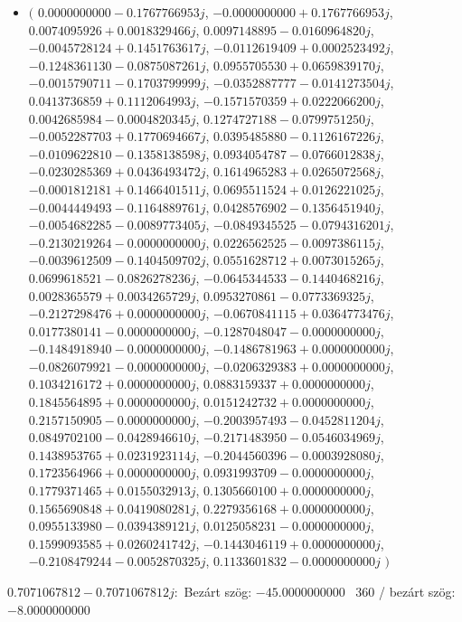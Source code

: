 \documentclass[14pt,a4paper]{article}
\begin{document}
\begin{itemize}
\item
$\big($
$0.0000000000-0.1767766953j$, $-0.0000000000+0.1767766953j$, $0.0074095926+0.0018329466j$, $0.0097148895-0.0160964820j$, $-0.0045728124+0.1451763617j$, $-0.0112619409+0.0002523492j$, $-0.1248361130-0.0875087261j$, $0.0955705530+0.0659839170j$, $-0.0015790711-0.1703799999j$, $-0.0352887777-0.0141273504j$, $0.0413736859+0.1112064993j$, $-0.1571570359+0.0222066200j$, $0.0042685984-0.0004820345j$, $0.1274727188-0.0799751250j$, $-0.0052287703+0.1770694667j$, $0.0395485880-0.1126167226j$, $-0.0109622810-0.1358138598j$, $0.0934054787-0.0766012838j$, $-0.0230285369+0.0436493472j$, $0.1614965283+0.0265072568j$, $-0.0001812181+0.1466401511j$, $0.0695511524+0.0126221025j$, $-0.0044449493-0.1164889761j$, $0.0428576902-0.1356451940j$, $-0.0054682285-0.0089773405j$, $-0.0849345525-0.0794316201j$, $-0.2130219264-0.0000000000j$, $0.0226562525-0.0097386115j$, $-0.0039612509-0.1404509702j$, $0.0551628712+0.0073015265j$, $0.0699618521-0.0826278236j$, $-0.0645344533-0.1440468216j$, $0.0028365579+0.0034265729j$, $0.0953270861-0.0773369325j$, $-0.2127298476+0.0000000000j$, $-0.0670841115+0.0364773476j$, $0.0177380141-0.0000000000j$, $-0.1287048047-0.0000000000j$, $-0.1484918940-0.0000000000j$, $-0.1486781963+0.0000000000j$, $-0.0826079921-0.0000000000j$, $-0.0206329383+0.0000000000j$, $0.1034216172+0.0000000000j$, $0.0883159337+0.0000000000j$, $0.1845564895+0.0000000000j$, $0.0151242732+0.0000000000j$, $0.2157150905-0.0000000000j$, $-0.2003957493-0.0452811204j$, $0.0849702100-0.0428946610j$, $-0.2171483950-0.0546034969j$, $0.1438953765+0.0231923114j$, $-0.2044560396-0.0003928080j$, $0.1723564966+0.0000000000j$, $0.0931993709-0.0000000000j$, $0.1779371465+0.0155032913j$, $0.1305660100+0.0000000000j$, $0.1565690848+0.0419080281j$, $0.2279356168+0.0000000000j$, $0.0955133980-0.0394389121j$, $0.0125058231-0.0000000000j$, $0.1599093585+0.0260241742j$, $-0.1443046119+0.0000000000j$, $-0.2108479244-0.0052870325j$, $0.1133601832-0.0000000000j$
$\big)$
\end{itemize}
$0.7071067812-0.7071067812j$:\
Bezárt szög: $-45.0000000000$ \
360 / bezárt szög: $-8.0000000000$\
\end{document}
